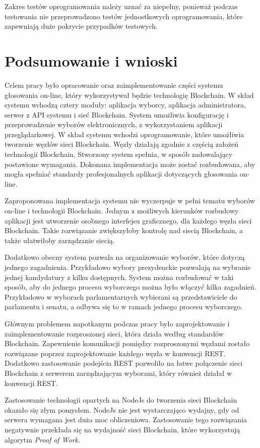\documentclass[a4paper,12pt]{book}
\begin{document}
Zakres testów oprogramowania należy uznać za niepełny, ponieważ podczas testowania nie przeprowadzono testów jednostkowych oprogramowania, które zapewniają duże pokrycie przypadków testowych.

\chapter{Podsumowanie i wnioski}

Celem pracy było opracowanie oraz zaimplementowanie części systemu głosowania on-line, który wykorzystywał będzie technologię Blockchain. W skład systemu wchodzą cztery moduły: aplikacja wyborcy, aplikacja administratora, serwer z API systemu i sieć Blockchain. System umożliwia konfigurację  i przeprowadzenie wyborów elektronicznych, z wykorzystaniem aplikacji przeglądarkowej. W skład systemu wchodzi oprogramowanie, które umożliwia tworzenie węzłów sieci Blockchain. Węzły działają zgodnie z częścią założeń technologii Blockchain.
Stworzony system spełnia, w sposób zadowalający postawione wymagania. Dokonana implementacja może zostać rozbudowana, aby mogła spełniać standardy profesjonalnych aplikacji dotyczących głosowania on-line.
 
Zaproponowana implementacja systemu nie wyczerpuje w pełni tematu wyborów on-line i technologii Blockchain. Jednym z możliwych kierunków rozbudowy aplikacji jest utworzenie osobnego interfejsu graficznego, dla każdego węzła sieci Blockchain. Takie rozwiązanie zwiększyłoby kontrolę nad siecią Blockchain, a także ułatwiłoby zarządzanie siecią.
 
Dodatkowo obecny system pozwala na organizowanie wyborów, które dotyczą jednego zagadnienia. Przykładowo wybory prezydenckie pozwalają na wybranie jednej kandydatury z kilku dostępnych. System można rozbudować w taki sposób, aby do jednego procesu wyborczego można było włączyć kilka zagadnień. Przykładowo w wyborach parlamentarnych wybierani są przedstawiciele do parlamentu i senatu, a odbywa się to w ramach jednego procesu wyborczego.
 
Głównym problemem napotkanym podczas pracy było zaprojektowanie i zaimplementowanie rozproszonej sieci, która działa według standardów Blockchain. Zapewnienie komunikacji pomiędzy rozproszonymi węzłami zostało rozwiązane poprzez zaprojektowanie każdego węzła w konwencji REST. Dodatkowo zastosowanie podejścia REST pozwoliło na łatwe połączenie sieci Blockchain z serwerem zarządzającym wyborami, który również działał w konwencji REST.
 
Zastosowanie technologii opartych na NodeJs do tworzenia sieci Blockchain okazało się złym pomysłem. NodeJs nie jest wystarczająco wydajny, gdy od serwera wymagana jest duża moc obliczeniowa. Zastosowanie tego rozwiązania negatywnie przekłada się na wydajność sieci Blockchain, które wykorzystują algorytm \textit{Proof of Work}.
\end{document}
